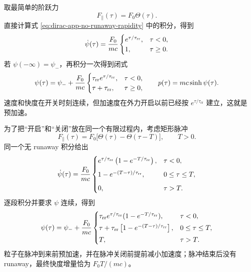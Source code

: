 取最简单的阶跃力
\begin{equation*}
 F_\parallel(\tau)=F_0\Theta(\tau).
\end{equation*}
直接计算式 \eqref{eq:dirac-app-no-runaway-rapidity} 中的积分，得到
\begin{equation}
 \dot\psi(\tau)
 ={F_0\over mc}
 \begin{cases}
 e^{\tau/\tau_{\mathrm{rr}}},&\tau<0,\\
 1,&\tau\geq0.
 \end{cases}
 \label{eq:dirac-app-step-rapidity-rate}
\end{equation}
若 $\psi(-\infty)=\psi_-$，再积分一次得到闭式
\begin{equation}
 \psi(\tau)=\psi_-+{F_0\over mc}
 \begin{cases}
 \tau_{\mathrm{rr}}e^{\tau/\tau_{\mathrm{rr}}},&\tau<0,\\
 \tau+\tau_{\mathrm{rr}},&\tau\geq0,
 \end{cases}
 \qquad
 p(\tau)=mc\sinh\psi(\tau).
 \label{eq:dirac-app-step-full-solution}
\end{equation}
速度和快度在开关时刻连续，但加速度在外力开启以前已经按 $e^{\tau/\tau_{\mathrm{rr}}}$ 建立，这就是预加速。

为了把“开启”和“关闭”放在同一个有限过程内，考虑矩形脉冲
\begin{equation*}
 F_\parallel(\tau)=F_0\bigl[\Theta(\tau)-\Theta(\tau-T)\bigr],
 \qquad T>0.
\end{equation*}
同一个无 runaway 积分给出
\begin{equation}
 \dot\psi(\tau)={F_0\over mc}
 \begin{cases}
 e^{\tau/\tau_{\mathrm{rr}}}
 \left(1-e^{-T/\tau_{\mathrm{rr}}}\right),&\tau<0,\\[2mm]
 1-e^{-(T-\tau)/\tau_{\mathrm{rr}}},&0\leq\tau\leq T,\\[2mm]
 0,&\tau>T.
 \end{cases}
 \label{eq:dirac-app-rectangular-pulse-rate}
\end{equation}
逐段积分并要求 $\psi$ 连续，得到
\begin{equation}
 \psi(\tau)=\psi_-+{F_0\over mc}
 \begin{cases}
 \tau_{\mathrm{rr}}e^{\tau/\tau_{\mathrm{rr}}}
 (1-e^{-T/\tau_{\mathrm{rr}}}),&\tau<0,\\[1mm]
 \tau+\tau_{\mathrm{rr}}
 \left[1-e^{-(T-\tau)/\tau_{\mathrm{rr}}}\right],&0\leq\tau\leq T,\\[1mm]
 T,&\tau>T.
 \end{cases}
 \label{eq:dirac-app-rectangular-pulse-solution}
\end{equation}
粒子在脉冲到来前预加速，并在脉冲关闭前提前减小加速度；脉冲结束后没有 runaway，最终快度增量恰为 $F_0T/(mc)$。

